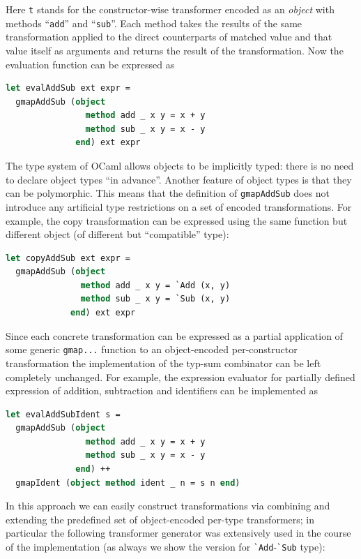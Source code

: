 Here \lstinline{t} stands for the constructor-wise transformer encoded
as an \emph{object} with methods ``\lstinline{add}'' and ``\lstinline{sub}''.
Each method takes the results of the same transformation applied to the
direct counterparts of matched value and that value itself as arguments
and returns the result of the transformation. Now the evaluation function
can be expressed as

\begin{lstlisting}[language=ocaml]
let evalAddSub ext expr = 
  gmapAddSub (object
                method add _ x y = x + y
                method sub _ x y = x - y
              end) ext expr
\end{lstlisting}

The type system of OCaml allows objects to be implicitly typed: there is 
no need to declare object types ``in advance''. Another feature of object
types is that they can be polymorphic. This means that the definition of
\lstinline{gmapAddSub} does not introduce any artificial type restrictions
on a set of encoded transformations. For example, the copy transformation
can be expressed using the same function but different object (of different but
``compatible'' type):

\begin{lstlisting}[language=ocaml]
let copyAddSub ext expr =
  gmapAddSub (object
               method add _ x y = `Add (x, y)
               method sub _ x y = `Sub (x, y)
             end) ext expr
\end{lstlisting}

Since each concrete transformation can be expressed as a partial application of
some generic \lstinline{gmap...} function to an object-encoded per-constructor
transformation the implementation of the typ-sum combinator can be left completely 
unchanged. For example, the expression evaluator for partially defined expression
of addition, subtraction and identifiers can be implemented as

\begin{lstlisting}[language=ocaml]
let evalAddSubIdent s = 
  gmapAddSub (object
                method add _ x y = x + y
                method sub _ x y = x - y
              end) ++
  gmapIdent (object method ident _ n = s n end)
\end{lstlisting}

In this approach we can easily construct transformations via combining and
extending the predefined set of object-encoded per-type transformers; in 
particular the following transformer generator was extensively used in the course
of the implementation (as always we show the version for \lstinline{`Add}-\lstinline{`Sub}
type):


